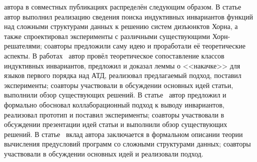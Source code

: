 
{\contribution} автора в совместных публикациях распределён следующим образом.
В статье~\cite{костюков2019автоматическое} автор выполнил  реализацию сведения поиска индуктивных инвариантов функций над сложными структурами данных к решению систем дизъюнктов Хорна, а также спроектировал  эксперименты с различными существующими Хорн-решателями; соавторы предложили саму идею и проработали её теоретические аспекты.
В работах~\cite{10.1145/3453483.3454055} автор провёл теоретическое сопоставление классов индуктивных инвариантов, предложил и доказал леммы о <<накачке>> для языков первого порядка над АТД, реализовал предлагаемый подход, поставил эксперименты; соавторы участвовали в обсуждении основных идей статьи, выполнили обзор существующих решений.
В статье~\cite{LPAR2023:Collaborative_Inference_of_Combined} автор предложил и формально обосновал коллаборационный подход к выводу инвариантов, реализовал прототип и поставил эксперименты; соавторы участвовали в обсуждении презентации идей статьи и выполнили обзор существующих решений.
В статье~\cite{мисонижник2022генерация} вклад автора заключается в формальном описании теории вычисления предусловий программ со сложными структурами данных; соавторы участвовали в обсуждении основных идей и реализовали подход.
